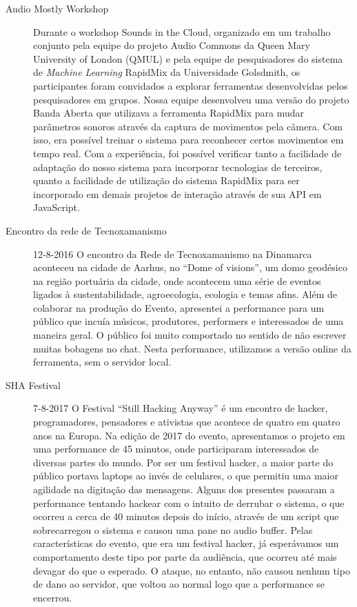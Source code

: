 \begin{description}
\item[Audio Mostly Workshop]
Durante o workshop Sounds in the Cloud, organizado em um trabalho conjunto pela equipe do projeto Audio Commons da Queen Mary University of London (QMUL) e pela equipe de pesquisadores do sistema de \emph{Machine Learning} RapidMix da Universidade Golsdmith, os participantes foram convidados a explorar ferramentas desenvolvidas pelos pesquisadores em grupos. Nossa equipe desenvolveu uma versão do projeto Banda Aberta que utilizava a ferramenta RapidMix para mudar parâmetros sonoros através da captura de movimentos pela câmera. Com isso, era possível treinar o sistema para reconhecer certos movimentos em tempo real. Com a experiência, foi possível verificar tanto a facilidade de adaptação do nosso sistema para incorporar tecnologias de terceiros, quanto a facilidade de utilização do sistema RapidMix para ser incorporado em demais projetos de interação através de sua API em JavaScript.

\item[Encontro da rede de Tecnoxamanismo] 12-8-2016
O encontro da Rede de Tecnoxamanismo na Dinamarca aconteceu na cidade de Aarhus, no ``Dome of visions'', um domo geodésico na região portuária da cidade, onde acontecem uma série de eventos ligados à sustentabilidade, agroecologia, ecologia e temas afins. Além de colaborar na produção do Evento, apresentei a performance para um público que incuía músicos, produtores, performers e interessados de uma maneira geral. O público foi muito comportado no sentido de não escrever muitas bobagens no chat. Nesta performance, utilizamos a versão online da ferramenta, sem o servidor local.


\item[SHA Festival] 7-8-2017
O Festival ``Still Hacking Anyway'' é um encontro de hacker, programadores, pensadores e ativistas que acontece de quatro em quatro anos na Europa. Na edição de 2017 do evento, apresentamos o projeto em uma performance de 45 minutos, onde participaram interessados de diversas partes do mundo. Por ser um festival hacker, a maior parte do público portava laptops ao invés de celulares, o que permitiu uma maior agilidade na digitação das mensagens. Alguns dos presentes passaram a performance tentando hackear com o intuito de derrubar o sistema, o que ocorreu a cerca de 40 minutos depois do início, através de um script que sobrecarregou o sistema e causou uma pane no audio buffer. Pelas características do evento, que era um festival hacker,  já esperávamos um comportamento deste tipo por parte da audiência, que ocorreu até mais devagar do que o esperado. O ataque, no entanto, não causou nenhum tipo de dano ao servidor, que voltou ao normal logo que a performance se encerrou.


\end{description}
